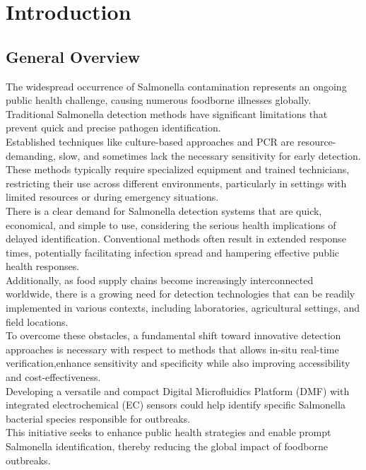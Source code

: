 \chapter{Introduction}
\section{General Overview}
The widespread occurrence of Salmonella contamination represents an ongoing public health challenge, causing numerous foodborne illnesses globally. Traditional Salmonella detection methods have significant limitations that prevent quick and precise pathogen identification.\\

Established techniques like culture-based approaches and PCR are resource-demanding, slow, and sometimes lack the necessary sensitivity for early detection. These methods typically require specialized equipment and trained technicians, restricting their use across different environments, particularly in settings with limited resources or during emergency situations.\\

There is a clear demand for Salmonella detection systems that are quick, economical, and simple to use, considering the serious health implications of delayed identification. Conventional methods often result in extended response times, potentially facilitating infection spread and hampering effective public health responses.\\

Additionally, as food supply chains become increasingly interconnected worldwide, there is a growing need for detection technologies that can be readily implemented in various contexts, including laboratories, agricultural settings, and field locations.\\

To overcome these obstacles, a fundamental shift toward innovative detection approaches is necessary with respect to methods that allows in-situ real-time verification,enhance sensitivity and specificity while also improving accessibility and cost-effectiveness.\\

Developing a versatile and compact Digital Microfluidics Platform (DMF) with integrated electrochemical (EC) sensors could help identify specific Salmonella bacterial species responsible for outbreaks.\\

This initiative seeks to enhance public health strategies and enable prompt Salmonella identification, thereby reducing the global impact of foodborne outbreaks.\\


